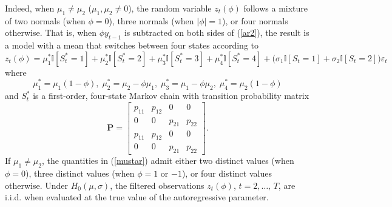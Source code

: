 \documentclass[11pt]{article}
\begin{document}
Indeed, when $\mu _{1}\neq \mu _{2}$ ($\mu _{1},\mu _{2}\neq 0$), the random
variable $z_{t}(\phi )$ follows a mixture of two normals (when $\phi =0$),
three normals (when $|\phi |=1$), or four normals otherwise. That is, when $%
\phi y_{t-1}$ is subtracted on both sides of (\ref{ar2}), the result is a
model with a mean that switches between four states according to 
\begin{equation*}
z_{t}(\phi )=\mu _{1}^{\ast }\mathbb{I}[S_{t}^{\ast }=1]+\mu _{2}^{\ast }%
\mathbb{I}[S_{t}^{\ast }=2]+\mu _{3}^{\ast }\mathbb{I}[S_{t}^{\ast }=3]+\mu
_{4}^{\ast }\mathbb{I}[S_{t}^{\ast }=4]+\big(\sigma _{1}\mathbb{I}%
[S_{t}=1]+\sigma _{2}\mathbb{I}[S_{t}=2]\big)\varepsilon _{t}
\end{equation*}%
where 
\begin{equation}
\mu _{1}^{\ast }=\mu _{1}(1-\phi ),\;\mu _{2}^{\ast }=\mu _{2}-\phi \mu
_{1},\;\mu _{3}^{\ast }=\mu _{1}-\phi \mu _{2},\;\mu _{4}^{\ast }=\mu
_{2}(1-\phi )  \label{mustar}
\end{equation}%
and $S_{t}^{\ast }$ is a first-order, four-state Markov chain with
transition probability matrix 
\begin{equation*}
\mathbf{P}=\left[ 
\begin{array}{cccc}
p_{11} & p_{12} & 0 & 0 \\ 
0 & 0 & p_{21} & p_{22} \\ 
p_{11} & p_{12} & 0 & 0 \\ 
0 & 0 & p_{21} & p_{22}%
\end{array}%
\right] .
\end{equation*}%
If $\mu _{1}\neq \mu _{2}$, the quantities in (\ref{mustar}) admit either
two distinct values (when $\phi =0$), three distinct values (when $\phi =1$
or $-1$), or four distinct values otherwise. Under $H_{0}(\mu ,\sigma )$,
the filtered observations $z_{t}(\phi )$, $t=2,\ldots ,\,T$, are i.i.d. when
evaluated at the true value of the autoregressive parameter.
\end{document}
